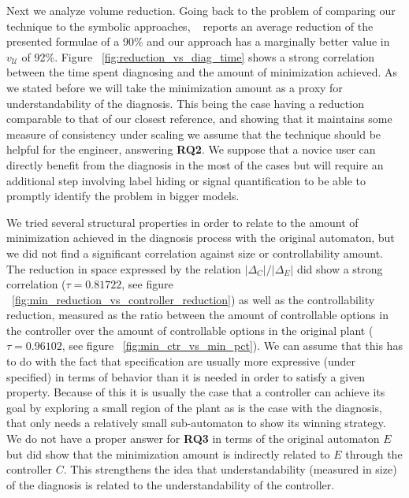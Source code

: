Next we analyze volume reduction. Going back to the problem of comparing our technique to the symbolic approaches, ~\cite{DBLP:conf/hvc/KonighoferHB10} reports an average reduction of the presented formulae of a 90\% and our approach has a marginally better value in $v_{\mathcal{U}}$ of 92\%. Figure ~\ref{fig:reduction_vs_diag_time} shows a strong correlation between the time spent diagnosing and the amount of minimization achieved. As we stated before we will take the minimization amount as a proxy for understandability of the diagnosis. This being the case having a reduction comparable to that of our closest reference, and showing that it maintains some measure of consistency under scaling we assume that the technique should be helpful for the engineer, answering \textbf{RQ2}.
We suppose that a novice user can directly benefit from the diagnosis in the most of the cases but will require an additional step involving label hiding or signal quantification to be able to promptly identify the problem in bigger models.

We tried several structural properties in order to relate to the amount of minimization achieved in the diagnosis process with the original automaton, but we did not find a significant correlation against size or controllability amount. The reduction in space expressed by the relation $|\Delta_{C}|/|\Delta_{E}|$ did show a strong correlation ($\tau=0.81722$, see figure ~\ref{fig:min_reduction_vs_controller_reduction}) as well as the controllability reduction, measured as the ratio between the amount of controllable options in the controller over the amount of controllable options in the original plant ($\tau=0.96102$, see figure ~\ref{fig:min_ctr_vs_min_pct}). We can assume that this has to do with the fact that specification are usually more expressive (under specified) in terms of behavior than it is needed in order to satisfy a given property. Because of this it is usually the case that a controller can achieve its goal by exploring a small region of the plant as is the case with the diagnosis, that only needs a relatively small sub-automaton to show its winning strategy. We do not have a proper answer for \textbf{RQ3} in terms of the original automaton $E$ but did show that the minimization amount is indirectly related to $E$ through the controller $C$. This strengthens the idea that understandability (measured in size) of the diagnosis is related to the understandability of the controller.